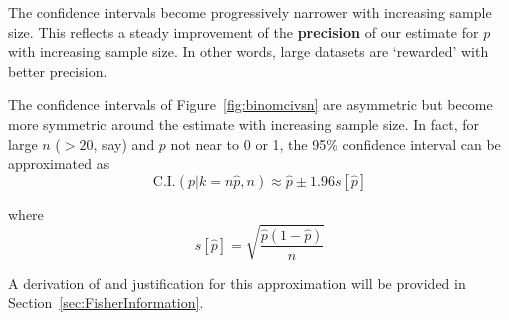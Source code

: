 The confidence intervals become progressively narrower with increasing
sample size. This reflects a steady improvement of the
\textbf{precision} of our estimate for $p$ with increasing sample
size. In other words, large datasets are `rewarded' with better
precision.\medskip

The confidence intervals of Figure~\ref{fig:binomcivsn} are asymmetric
but become more symmetric around the estimate with increasing sample
size. In fact, for large $n$ ($>20$, say) and $p$ not near to 0 or 1,
the 95\% confidence interval can be approximated as
\begin{equation}
  \mbox{C.I.}(p|k=n\hat{p},n) \approx
  \hat{p} \pm 1.96 s[\hat{p}]
  \label{eq:binormci}
\end{equation}

\noindent where 
\begin{equation}
  s[\hat{p}] = \sqrt{\frac{\hat{p}(1-\hat{p})}{n}}
  \label{eq:sigmabinom}
\end{equation}

A derivation of and justification for this approximation will be
provided in Section~\ref{sec:FisherInformation}.
